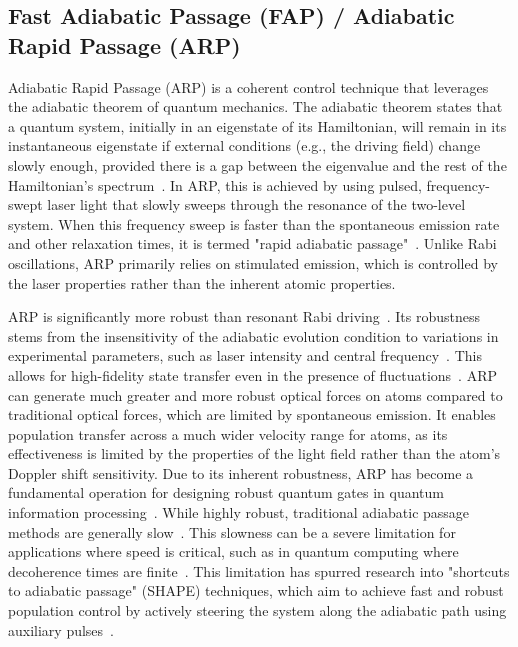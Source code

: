 \documentclass{article}
\begin{document}
\subsection*{Fast Adiabatic Passage (FAP) / Adiabatic Rapid Passage (ARP)}
Adiabatic Rapid Passage (ARP) is a coherent control technique that leverages the adiabatic theorem of quantum mechanics. The adiabatic theorem states that a quantum system, initially in an eigenstate of its Hamiltonian, will remain in its instantaneous eigenstate if external conditions (e.g., the driving field) change slowly enough, provided there is a gap between the eigenvalue and the rest of the Hamiltonian's spectrum~\cite{Comparat2006GeneralCF}. In ARP, this is achieved by using pulsed, frequency-swept laser light that slowly sweeps through the resonance of the two-level system. When this frequency sweep is faster than the spontaneous emission rate and other relaxation times, it is termed "rapid adiabatic passage"~\cite{Malinovsky2001GeneralTO}. Unlike Rabi oscillations, ARP primarily relies on stimulated emission, which is controlled by the laser properties rather than the inherent atomic properties.

ARP is significantly more robust than resonant Rabi driving~\cite{Malinovsky2001GeneralTO}. Its robustness stems from the insensitivity of the adiabatic evolution condition to variations in experimental parameters, such as laser intensity and central frequency~\cite{Wilbur2022NotchfilteredAR}. This allows for high-fidelity state transfer even in the presence of fluctuations~\cite{Wilbur2022NotchfilteredAR}. ARP can generate much greater and more robust optical forces on atoms compared to traditional optical forces, which are limited by spontaneous emission. It enables population transfer across a much wider velocity range for atoms, as its effectiveness is limited by the properties of the light field rather than the atom's Doppler shift sensitivity. Due to its inherent robustness, ARP has become a fundamental operation for designing robust quantum gates in quantum information processing~\cite{Malinovsky2001GeneralTO}. While highly robust, traditional adiabatic passage methods are generally slow~\cite{Malinovsky2001GeneralTO}. This slowness can be a severe limitation for applications where speed is critical, such as in quantum computing where decoherence times are finite~\cite{Malinovsky2001GeneralTO}. This limitation has spurred research into "shortcuts to adiabatic passage" (SHAPE) techniques, which aim to achieve fast and robust population control by actively steering the system along the adiabatic path using auxiliary pulses~\cite{Malinovsky2001GeneralTO}.
\end{document}
